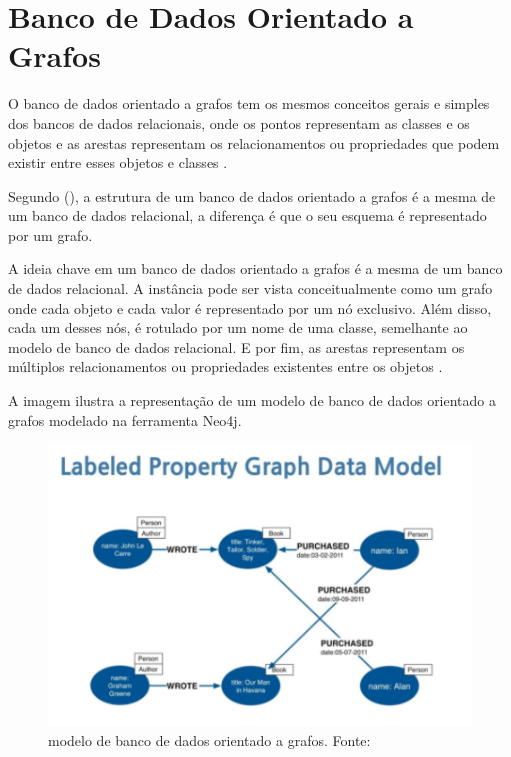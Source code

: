 \section{Banco de Dados Orientado a Grafos}

O banco de dados orientado a grafos tem os mesmos conceitos gerais e simples dos bancos de dados relacionais, onde os pontos representam as classes e os objetos e as arestas representam os relacionamentos ou propriedades que podem existir entre esses objetos e classes \cite{paredaens1992overview}.

Segundo \citeauthor{gyssens1994graph} (\citeyear{gyssens1994graph}), a estrutura de um banco de dados orientado a grafos é a mesma de um banco de dados relacional, a diferença é que o seu esquema é representado por um grafo.

A ideia chave em um  banco de dados orientado a grafos é a mesma de um banco de dados relacional. A instância pode ser vista conceitualmente como um grafo onde cada objeto e cada valor é representado por um nó exclusivo. Além disso, cada um desses nós, é rotulado por um nome de uma classe, semelhante ao modelo de banco de dados relacional. E por fim, as arestas representam os múltiplos relacionamentos ou propriedades existentes entre os objetos \cite{paredaens1992overview}.

A imagem ilustra a representação de um modelo de banco de dados orientado a grafos modelado na ferramenta Neo4j.

\begin{figure}[h] 
\centering 
\includegraphics[scale=0.6]{Figuras/grafo3.png} 
\caption[modelo de banco de dados orientado a grafos]
{ modelo de banco de dados orientado a grafos. Fonte: \cite{DanielaLucas2008}}
\label{fig:grafo1}
\end{figure}


